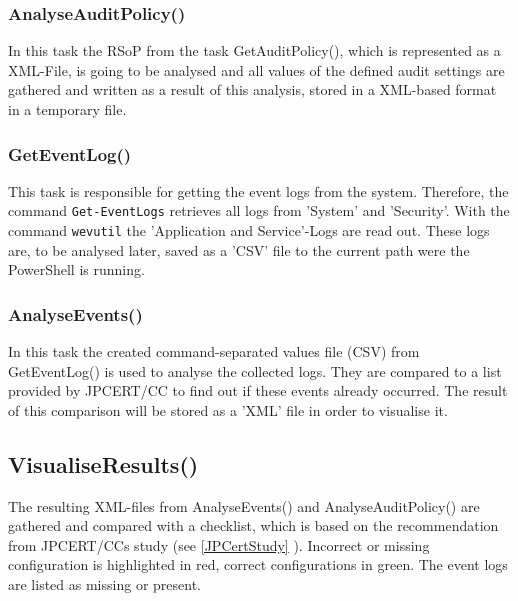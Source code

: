 \subsubsection{AnalyseAuditPolicy()}
In this task the RSoP from the task GetAuditPolicy(), which is represented as a XML-File, is going to be analysed and all values of the defined audit settings are gathered and written as a result of this analysis, stored in a XML-based format in a temporary file.

\subsubsection{GetEventLog()}
This task is responsible for getting the event logs from the system. Therefore, the command \lstinline|Get-EventLogs| \cite{Get-EventLogs} retrieves all logs from 'System' and 'Security'. With the command \lstinline|wevutil| the 'Application and Service'-Logs are read out. These logs are, to be analysed later, saved as a 'CSV' file to the current path were the PowerShell is running.

\subsubsection{AnalyseEvents()}
In this task the created command-separated values file (CSV) from GetEventLog() is used to analyse the collected logs. They are compared to a list provided by JPCERT/CC to find out if these events already occurred. The result of this comparison will be stored as a 'XML' file in order to visualise it.

\subsection{VisualiseResults()}
The resulting XML-files from AnalyseEvents() and AnalyseAuditPolicy() are gathered and compared with a checklist, which is based on the recommendation from JPCERT/CCs study (see \ref{JPCertStudy} ). Incorrect or missing configuration is highlighted in red, correct configurations in green. The event logs are listed as missing or present.


